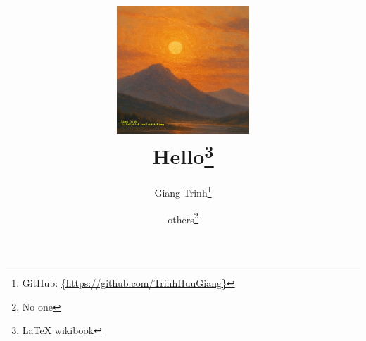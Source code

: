 \documentclass[12pt, a4paper, twoside]{report}
\begin{document}




\pagestyle{headings}





\title
{
    \includegraphics[width=5cm]{./sunset.png} \\
    \textbf{Hello\thanks{\LaTeX {} wikibook}}
}
\author{Giang Trinh\thanks{GitHub: \url{{https://github.com/TrinhHuuGiang}}}
    \and others\thanks{No one}}
\maketitle
\end{document}
